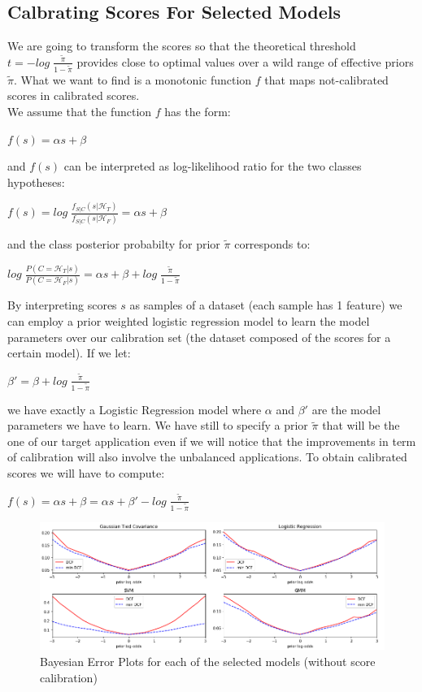 \documentclass[10pt, a4paper, twocolumn]{article} %
\begin{document}
\subsection{Calbrating Scores For Selected Models}
We are going to transform the scores so that the theoretical threshold $t = -log\;\frac{\tilde{\pi}}{1-\tilde{\pi}}$
provides close to optimal values over a wild range of effective priors $\tilde{\pi}$. What we want to find is a 
monotonic function $f$ that maps not-calibrated scores in calibrated scores.\\
We assume that the function $f$ has the form:
\begin{center}
	$f(s) = \alpha s + \beta$
\end{center}
and $f(s)$ can be interpreted as log-likelihood ratio for the two classes hypotheses:
\begin{center}
	$f(s) = log\;\frac{f_{S|C}(s|\mathcal{H}_T)}{f_{S|C}(s|\mathcal{H}_F)} = \alpha s + \beta$
\end{center}
and the class posterior probabilty for prior $\tilde{\pi}$ corresponds to:
\begin{center}
	$log\;\frac{P(C=\mathcal{H}_T|s)}{P(C=\mathcal{H}_F|s)} = \alpha s + \beta + log\;\frac{\tilde{\pi}}{1-\tilde{\pi}}$
\end{center}
By interpreting scores $s$ as samples of a dataset (each sample has 1 feature) we can employ a prior weighted
logistic regression model to learn the model parameters over our calibration set (the dataset composed of the
scores for a certain model). If we let:
\begin{center}
	$\beta' = \beta + log\;\frac{\tilde{\pi}}{1-\tilde{\pi}}$
\end{center}
we have exactly a Logistic Regression model where $\alpha$ and $\beta'$ are the model parameters we have to learn.
We have still to specify a prior $\tilde{\pi}$ that will be the one of our target application even if we will notice
that the improvements in term of calibration will also involve the unbalanced applications. To obtain calibrated
scores we will have to compute:
\begin{center}
	$f(s) = \alpha s + \beta = \alpha s + \beta' - log\;\frac{\tilde{\pi}}{1-\tilde{\pi}}$
\end{center}
\begin{figure}[ht!]
	\includegraphics[width=\linewidth]{./Pictures/FeaturesAnalysis/bestmodels_nc.png}
	\caption{Bayesian Error Plots for each of the selected models (without score calibration)}
	\label{bayesianerrornotcalibrated} 
\end{figure}
\end{document}
